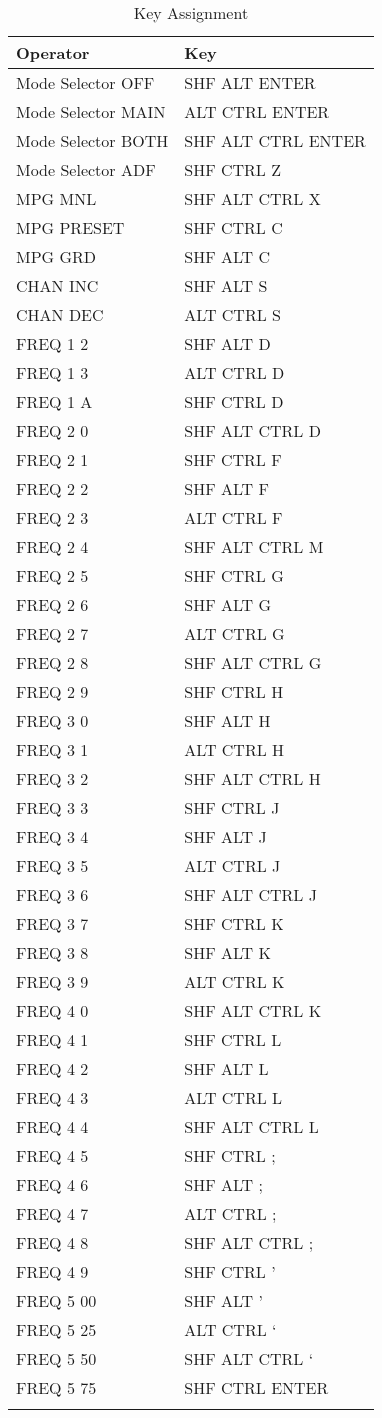 \documentclass[12pt, a4paper]{report}
\begin{document}
\begin{longtable}{ *{2}{| l } | }
\hline
\textbf{Operator} & \textbf{Key} \\
\hline
\endhead
Mode Selector OFF & SHF ALT ENTER \\
Mode Selector MAIN & ALT CTRL ENTER \\
Mode Selector BOTH & SHF ALT CTRL ENTER \\
Mode Selector ADF & SHF CTRL Z \\
MPG MNL & SHF ALT CTRL X \\
MPG PRESET & SHF CTRL C \\
MPG GRD & SHF ALT C \\
CHAN INC & SHF ALT S \\
CHAN DEC & ALT CTRL S \\
FREQ 1 2 & SHF ALT D \\
FREQ 1 3 & ALT CTRL D \\
FREQ 1 A & SHF CTRL D \\
FREQ 2 0 & SHF ALT CTRL D \\
FREQ 2 1 & SHF CTRL F \\
FREQ 2 2 & SHF ALT F \\
FREQ 2 3 & ALT CTRL F \\
FREQ 2 4 & SHF ALT CTRL M \\
FREQ 2 5 & SHF CTRL G \\
FREQ 2 6 & SHF ALT G \\
FREQ 2 7 & ALT CTRL G \\
FREQ 2 8 & SHF ALT CTRL G \\
FREQ 2 9 & SHF CTRL H \\ 
FREQ 3 0 & SHF ALT H \\
FREQ 3 1 & ALT CTRL H \\
FREQ 3 2 & SHF ALT CTRL H \\
FREQ 3 3 & SHF CTRL J \\
FREQ 3 4 & SHF ALT J \\
FREQ 3 5 & ALT CTRL J \\
FREQ 3 6 & SHF ALT CTRL J \\
FREQ 3 7 & SHF CTRL K \\
FREQ 3 8 & SHF ALT K \\ 
FREQ 3 9 & ALT CTRL K \\
FREQ 4 0 & SHF ALT CTRL K \\
FREQ 4 1 & SHF CTRL L \\
FREQ 4 2 & SHF ALT L \\
FREQ 4 3 & ALT CTRL L \\
FREQ 4 4 & SHF ALT CTRL L \\
FREQ 4 5 & SHF CTRL ; \\
FREQ 4 6 & SHF ALT ; \\
FREQ 4 7 & ALT CTRL ; \\
FREQ 4 8 & SHF ALT CTRL ; \\
FREQ 4 9 & SHF CTRL ' \\
FREQ 5 00 & SHF ALT ' \\
FREQ 5 25 & ALT CTRL ` \\
FREQ 5 50 & SHF ALT CTRL ` \\
FREQ 5 75 & SHF CTRL ENTER \\
\hline
\caption {Key Assignment}
\end {longtable}
\end{document}
